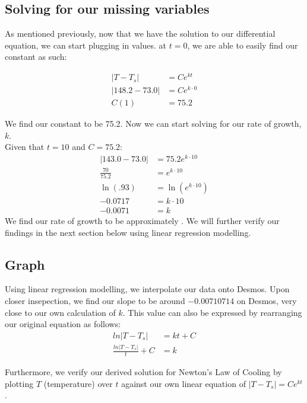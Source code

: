 \documentclass{article}
\begin{document}
\subsection{Solving for our missing variables}
As mentioned previously, now that we have the solution to our differential equation, we can start plugging in values. at $t = 0$, we are able to easily find our constant as such:

\begin{align}
    |T-T_s| &= Ce^{kt}\\[1em]
    |148.2-73.0| &= Ce^{k\cdot 0}\\[1em]
    C(1) &= 75.2
\end{align}

We find our constant to be 75.2. Now we can start solving for our rate of growth, $k$.\\

Given that $t = 10$ and $C = 75.2$:
\begin{align}
    |143.0-73.0| &= 75.2e^{k\cdot 10}\\[1em]
    \frac{70}{75.2} &= e^{k\cdot 10}\\[1em]
    \ln{(.93)} &= \ln{(e^{k\cdot 10})}\\[1em]
    -0.0717 &= k \cdot 10 \\[1em]
    -0.0071 &= k
\end{align}
We find our rate of growth to be approximately  . We will further verify our findings in the next section below using linear regression modelling.

\subsection{Graph}
Using linear regression modelling, we interpolate our data onto Desmos. Upon closer insepection, we find our slope to be around $-0.00710714$ on Desmos, very close to our own calculation of $k$. This value can also be expressed by rearranging our original equation as follows:
\begin{align}
    ln|T-T_s| &= kt+C\\
    \frac{ln|T-T_s|}{t}+C &=k
\end{align}

\newpage
Furthermore, we verify our derived solution for Newton's Law of Cooling by plotting $T$ (temperature) over $t$ against our own linear equation of $\boxed{|T-T_s| = Ce^{kt}}$.\\
\end{document}
